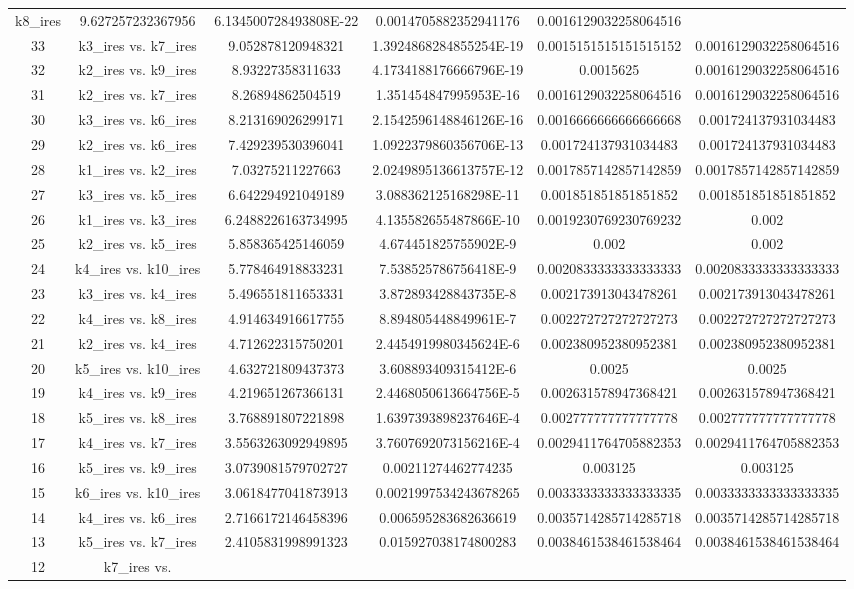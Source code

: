 \documentclass[a4paper,10pt]{article}
\begin{document}
\begin{landscape}
\begin{table}[!htp]
\begin{tabular}{cccccc}
k8_ires&9.627257232367956&6.134500728493808E-22&0.0014705882352941176&0.0016129032258064516\\33&k3_ires vs. k7_ires&9.052878120948321&1.3924868284855254E-19&0.0015151515151515152&0.0016129032258064516\\32&k2_ires vs. k9_ires&8.93227358311633&4.1734188176666796E-19&0.0015625&0.0016129032258064516\\31&k2_ires vs. k7_ires&8.26894862504519&1.351454847995953E-16&0.0016129032258064516&0.0016129032258064516\\30&k3_ires vs. k6_ires&8.213169026299171&2.1542596148846126E-16&0.0016666666666666668&0.001724137931034483\\29&k2_ires vs. k6_ires&7.429239530396041&1.0922379860356706E-13&0.001724137931034483&0.001724137931034483\\28&k1_ires vs. k2_ires&7.03275211227663&2.0249895136613757E-12&0.0017857142857142859&0.0017857142857142859\\27&k3_ires vs. k5_ires&6.642294921049189&3.088362125168298E-11&0.001851851851851852&0.001851851851851852\\26&k1_ires vs. k3_ires&6.2488226163734995&4.135582655487866E-10&0.0019230769230769232&0.002\\25&k2_ires vs. k5_ires&5.858365425146059&4.674451825755902E-9&0.002&0.002\\24&k4_ires vs. k10_ires&5.778464918833231&7.538525786756418E-9&0.0020833333333333333&0.0020833333333333333\\23&k3_ires vs. k4_ires&5.496551811653331&3.872893428843735E-8&0.002173913043478261&0.002173913043478261\\22&k4_ires vs. k8_ires&4.914634916617755&8.894805448849961E-7&0.002272727272727273&0.002272727272727273\\21&k2_ires vs. k4_ires&4.712622315750201&2.4454919980345624E-6&0.002380952380952381&0.002380952380952381\\20&k5_ires vs. k10_ires&4.632721809437373&3.608893409315412E-6&0.0025&0.0025\\19&k4_ires vs. k9_ires&4.219651267366131&2.4468050613664756E-5&0.002631578947368421&0.002631578947368421\\18&k5_ires vs. k8_ires&3.768891807221898&1.6397393898237646E-4&0.002777777777777778&0.002777777777777778\\17&k4_ires vs. k7_ires&3.5563263092949895&3.7607692073156216E-4&0.0029411764705882353&0.0029411764705882353\\16&k5_ires vs. k9_ires&3.0739081579702727&0.00211274462774235&0.003125&0.003125\\15&k6_ires vs. k10_ires&3.0618477041873913&0.0021997534243678265&0.0033333333333333335&0.0033333333333333335\\14&k4_ires vs. k6_ires&2.7166172146458396&0.006595283682636619&0.0035714285714285718&0.0035714285714285718\\13&k5_ires vs. k7_ires&2.4105831998991323&0.015927038174800283&0.0038461538461538464&0.0038461538461538464\\12&k7_ires vs. 
\end{tabular}
\end{table}
\end{landscape}
\end{document}
